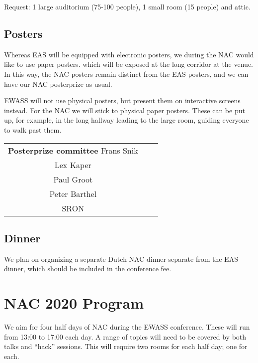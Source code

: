 \documentclass{article}
\begin{document}
Request: 1 large auditorium (75-100 people), 1 small room (15 people) and attic.

\subsection{Posters}

Whereas EAS will be equipped with electronic posters, we during the
NAC would like to use paper posters. which will be exposed at the long
corridor at the venue.  In this way, the NAC posters remain distinct
from the EAS posters, and we can have our NAC posterprize as usual.

EWASS will not use physical posters, but present them on interactive
screens instead. For the NAC we will stick to physical paper
posters. These can be put up, for example, in the long hallway leading
to the large room, guiding everyone to walk past them.

\begin{center}
    \begin{tabular}{ccc}
        \textbf{Posterprize committee}
        \hline
        Frans Snik \\
        Lex Kaper \\
        Paul Groot \\
        Peter Barthel \\         
        SRON  \\         
    \end{tabular}
\end{center}

\subsection{Dinner}

We plan on organizing a separate Dutch NAC dinner separate from the
EAS dinner, which should be included in the conference fee.

\section{NAC 2020 Program}

We aim for four half days of NAC during the EWASS conference. These
will run from 13:00 to 17:00 each day. A range of topics will need to
be covered by both talks and ``hack'' sessions. This will require two
rooms for each half day; one for each.
\end{document}
